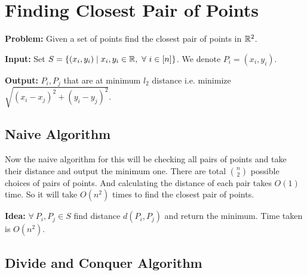 \chapter{Finding Closest Pair of Points}

\parinf

\textbf{{Problem}:}  Given a set of points find the closest pair of points  in $\mathbb{R}^2$. 

\textbf{Input:} Set $S=\{(x_i,y_i)\mid x_i,y_i\in\bbR, \ \forall\ i\in[n]\}$. We denote $P_i=(x_i,y_i)$. 

\textbf{Output:} $P_i,P_j$ that are at minimum $l_2$ distance i.e. minimize $\sqrt{(x_i-x_j)^2+(y_i-y_j)^2}$. 

\section{Naive Algorithm}

Now the naive algorithm for this will be checking all pairs of points and take their distance and output the minimum one. There are total $\binom{n }{2}$ possible choices of pairs of points. And calculating the distance of each pair takes $O(1)$ time. So it will take $O(n^2)$ times to find the closest pair of points. \parinf

\textbf{Idea:} $\forall\ P_i,P_j\in S$ find distance $d(P_i,P_j)$ and return the minimum. Time taken is $O(n^2)$. 

\section{Divide and Conquer Algorithm}

